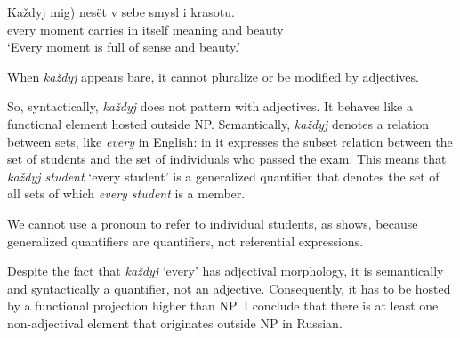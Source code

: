 \documentclass[output=paper]{langscibook}
\begin{document}

\ea \gll Každyj \minsp{*(} mig) nesët v sebe smysl i krasotu.\\
every {} moment carries in itself meaning and beauty\\
\glt `Every moment is full of sense and beauty.'
\z

\noindent When \textit{každyj} appears bare, it cannot pluralize or be modified by adjectives.


\ea 
\z\z 

\noindent So, syntactically, \textit{každyj} does not pattern with adjectives. It behaves like a functional element hosted outside NP. 
Semantically, \textit{každyj} denotes a relation between sets, like \textit{every} in English: in  it expresses the subset relation between the set of students and the set of individuals who passed the exam.  This means that \textit{každyj student} `every student' is a generalized quantifier that denotes the set of all sets of which \textit{every student} is a member. 


\ea\label{41_ekzamen}
\z\z 

\noindent We cannot use a pronoun to refer to individual students, as  shows, because generalized quantifiers are quantifiers, not referential expressions.  

Despite the fact that \textit{každyj} `every' has adjectival morphology, it is semantically and syntactically a quantifier, not an adjective. Consequently, it has to be hosted by a functional projection higher than NP. I conclude that there is at least one non-adjectival element that originates outside NP in Russian. 
%
%
\end{document}
